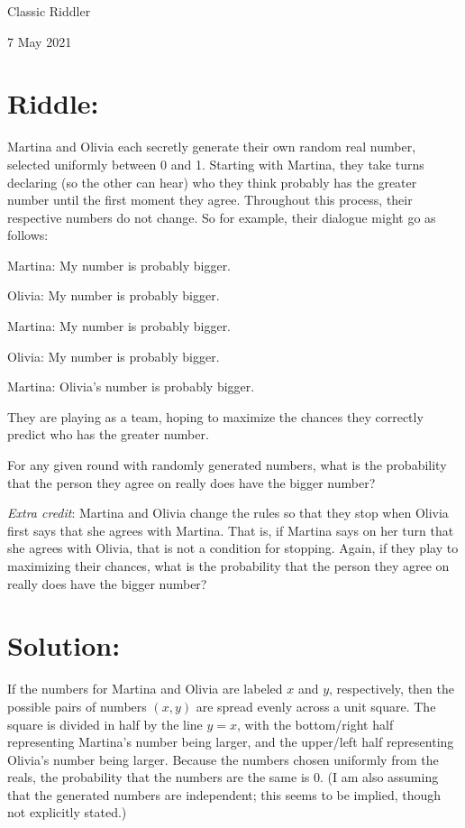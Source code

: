 \documentclass{article}
\begin{document}
\pagestyle{empty} %

\begin{center}
{\LARGE Classic Riddler}

\vspace{0.15in}

{\Large 7 May 2021}
\end{center}


\section*{Riddle:}

Martina and Olivia each secretly generate their own random real number, selected uniformly between 0 and 1.
Starting with Martina, they take turns declaring (so the other can hear) who they think probably has the greater number until the first moment they agree.
Throughout this process, their respective numbers do not change.
So for example, their dialogue might go as follows:

Martina: My number is probably bigger.

Olivia: My number is probably bigger.

Martina: My number is probably bigger.

Olivia: My number is probably bigger.

Martina: Olivia's number is probably bigger.

They are playing as a team, hoping to maximize the chances they correctly predict who has the greater number.

For any given round with randomly generated numbers, what is the probability that the person they agree on really does have the bigger number?

\textit{Extra credit}: Martina and Olivia change the rules so that they stop when Olivia first says that she agrees with Martina.
That is, if Martina says on her turn that she agrees with Olivia, that is not a condition for stopping.
Again, if they play to maximizing their chances, what is the probability that the person they agree on really does have the bigger number?



\section*{Solution:}

If the numbers for Martina and Olivia are labeled $x$ and $y$, respectively, then the possible pairs of numbers $(x,y)$ are spread evenly across a unit square.
The square is divided in half by the line $y=x$, with the bottom/right half representing Martina's number being larger, and the upper/left half representing Olivia's number being larger.
Because the numbers chosen uniformly from the reals, the probability that the numbers are the same is 0.
(I am also assuming that the generated numbers are independent; this seems to be implied, though not explicitly stated.)
\end{document}
